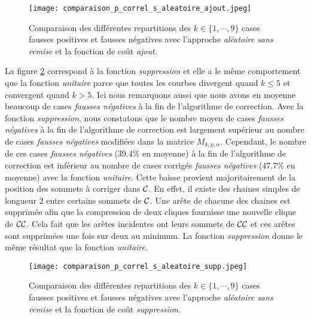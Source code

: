 \begin{figure}[htb!] 
\centering
\texttt{[image: comparaison\_p\_correl\_s\_aleatoire\_ajout.jpeg]}
\caption{ Comparaison des diff\'erentes repartitions des $k \in \{1,\cdots,9\}$ cases fausses positives et fausses n\'egatives avec l'approche {\em al\'eatoire sans remise} et la fonction de co\^ut {\em ajout}.  }
\label{comparaison_p_correl_s_aleatoire_ajout} 
\end{figure}

La figure \ref{comparaison_p_correl_s_aleatoire_supp} correspond \`a la fonction {\em suppression} et elle a le m\^eme comportement que la fonction {\em unitaire} parce que toutes les courbes divergent quand $k \le 5$ et convergent quand  $k > 5$. Ici nous remarquons aussi que nous avons en moyenne beaucoup de cases {\em fausses n\'egatives} \`a la fin de l'algorithme de correction. 
Avec la fonction {\em suppression}, nous constatons que le nombre moyen de cases {\em fausses n\'egatives} \`a la fin de l'algorithme de correction est largement sup\'erieur au nombre de cases {\em fausses n\'egatives} modifi\'ees dans la matrice $M_{k,p,\alpha}$.
Cependant, le nombre de ces cases {\em fausses n\'egatives}  ($39.4\%$ en moyenne) \`a la fin de l'algorithme de correction est inf\'erieur au nombre de cases corrig\'es {\em fausses n\'egatives}  ($47.7\%$ en moyenne) avec la fonction {\em unitaire}. 
Cette baisse provient majoritairement de la position des sommets \`a corriger dans ${\cal C}$. 
En effet, il existe des chaines simples de longueur $2$ entre certains sommets de  ${\cal C}$.  Une ar\^ete de chacune des chaines est supprim\'ee afin que la compression de deux cliques fournisse une nouvelle clique de ${\cal CC}$. Cela fait que les ar\^etes incidentes ont leurs sommets de ${\cal CC}$ et ces ar\^etes sont supprim\'ees une fois sur deux au minimum. 
La fonction {\em suppression} donne le m\^eme r\'esultat que la fonction {\em unitaire}.

\begin{figure}[htb!] 
\centering
\texttt{[image: comparaison\_p\_correl\_s\_aleatoire\_supp.jpeg]}
\caption{ Comparaison des diff\'erentes repartitions des $k \in \{1,\cdots,9\}$ cases fausses positives et fausses n\'egatives avec l'approche {\em al\'eatoire sans remise} et la fonction de co\^ut {\em suppression}. }
\label{comparaison_p_correl_s_aleatoire_supp} 
\end{figure}

